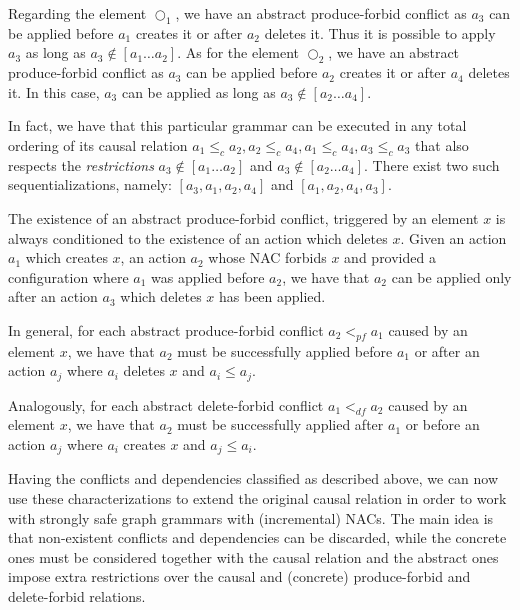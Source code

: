 \begin{example}
  Regarding the element $\Circle_1$, we have an abstract produce-forbid conflict as $a_3$ can be applied before $a_1$ creates it or after $a_2$ deletes it. Thus it is possible to apply $a_3$ as long as $a_3 \not\in [a_1\ldots a_2]$. As for the element $\Circle_2$, we have an abstract produce-forbid conflict as $a_3$ can be applied before $a_2$ creates it or after $a_4$ deletes it. In this case, $a_3$ can be applied as long as $a_3 \not\in [a_2\ldots a_4]$.

  In fact, we have that this particular grammar can be executed in any total ordering of its causal relation $a_1 \leq_c a_2, a_2 \leq_c a_4, a_1 \leq_c a_4, a_3 \leq_c a_3$ that also respects the \emph{restrictions} $a_3 \not\in [a_1\ldots a_2]$ and $a_3 \not\in [a_2\ldots a_4]$. There exist two such sequentializations, namely: $[a_3, a_1, a_2, a_4]$ and $[a_1,a_2,a_4,a_3]$.
\end{example}

\begin{remark} The existence of an abstract produce-forbid conflict, triggered by an element $x$ is always conditioned to the existence of an action which deletes $x$. Given an action $a_1$ which creates $x$, an action $a_2$ whose NAC forbids $x$ and provided a configuration where $a_1$ was applied before $a_2$, we have that $a_2$ can be applied only after an action $a_3$ which deletes $x$ has been applied.

  In general, for each abstract produce-forbid conflict $a_2 <_{pf} a_1$ caused by an element $x$, we have that $a_2$ must be successfully applied before $a_1$ or after an action $a_{j}$ where $a_i$ deletes $x$ and $a_i \leq a_j$.

  Analogously, for each abstract delete-forbid conflict $a_1 <_{df} a_2$ caused by an element $x$, we have that $a_2$ must be successfully applied after $a_1$ or before an action $a_j$ where $a_i$ creates $x$ and $a_j \leq a_i$.
\end{remark}

Having the conflicts and dependencies classified as described above, we can now use these characterizations to extend the original causal relation in order to work with strongly safe graph grammars with (incremental) NACs. The main idea is that non-existent conflicts and dependencies can be discarded, while the concrete ones must be considered together with the causal relation and the abstract ones impose extra restrictions over the causal and (concrete) produce-forbid and delete-forbid relations.

